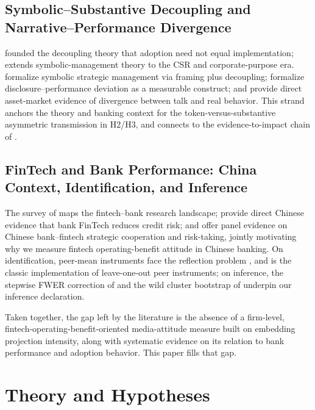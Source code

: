 \subsection{Symbolic--Substantive Decoupling and Narrative--Performance Divergence}\label{sec:lit:decouple}
\textcite{westphal1994substance} founded the decoupling theory that
adoption need not equal implementation; \textcite{westphal2023systemic}
extends symbolic-management theory to the CSR and corporate-purpose
era. \textcite{fiss2006symbolic} formalize symbolic strategic
management via framing plus decoupling; \textcite{kim2015greenwash}
formalize disclosure--performance deviation as a measurable construct;
and \textcite{duchin2025greenwashing} provide direct asset-market
evidence of divergence between talk and real behavior. This strand
anchors the theory and banking context for the token-versus-substantive
asymmetric transmission in H2/H3, and connects to the
evidence-to-impact chain of \parencite{distel2026evidence}.

\subsection{FinTech and Bank Performance: China Context, Identification, and Inference}\label{sec:lit:fintech}
The survey of \textcite{berg2022fintech} maps the fintech--bank
research landscape; \textcite{cheng2020fintech} provide direct Chinese
evidence that bank FinTech reduces credit risk; and
\textcite{wu2025cooperation} offer panel evidence on Chinese
bank--fintech strategic cooperation and risk-taking, jointly motivating
why we measure fintech operating-benefit attitude in Chinese banking.
On identification, peer-mean instruments face the reflection problem
\parencite{manski1993reflection}, and \textcite{leary2014peer} is the
classic implementation of leave-one-out peer instruments; on inference,
the stepwise FWER correction of \textcite{romano2005stepwise} and the
wild cluster bootstrap of \textcite{roodman2019boottest} underpin our
inference declaration.

Taken together, the gap left by the literature is the absence of a
firm-level, fintech-operating-benefit-oriented media-attitude measure
built on embedding projection intensity, along with systematic evidence
on its relation to bank performance and adoption behavior. This paper
fills that gap.

\section{Theory and Hypotheses}\label{sec:theory}

